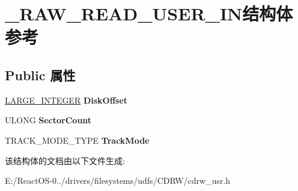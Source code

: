 \hypertarget{struct___r_a_w___r_e_a_d___u_s_e_r___i_n}{}\section{\+\_\+\+R\+A\+W\+\_\+\+R\+E\+A\+D\+\_\+\+U\+S\+E\+R\+\_\+\+I\+N结构体 参考}
\label{struct___r_a_w___r_e_a_d___u_s_e_r___i_n}
\subsection*{Public 属性}
\begin{DoxyCompactItemize}
\item 
\mbox{\label{struct___r_a_w___r_e_a_d___u_s_e_r___i_n_a988d6a9612a259579d6eeda2a041cb04}} 
\hyperlink{union___l_a_r_g_e___i_n_t_e_g_e_r}{L\+A\+R\+G\+E\+\_\+\+I\+N\+T\+E\+G\+ER} {\bfseries Disk\+Offset}
\item 
\mbox{\label{struct___r_a_w___r_e_a_d___u_s_e_r___i_n_a5ee5e3faab99a2487e01258857475e74}} 
U\+L\+O\+NG {\bfseries Sector\+Count}
\item 
\mbox{\label{struct___r_a_w___r_e_a_d___u_s_e_r___i_n_ae0735d6a78ec9efb8c272607ca75c238}} 
T\+R\+A\+C\+K\+\_\+\+M\+O\+D\+E\+\_\+\+T\+Y\+PE {\bfseries Track\+Mode}
\end{DoxyCompactItemize}


该结构体的文档由以下文件生成\+:\begin{DoxyCompactItemize}
\item 
E\+:/\+React\+O\+S-\/0../drivers/filesystems/udfs/\+C\+D\+R\+W/cdrw\+\_\+usr.\+h\end{DoxyCompactItemize}
